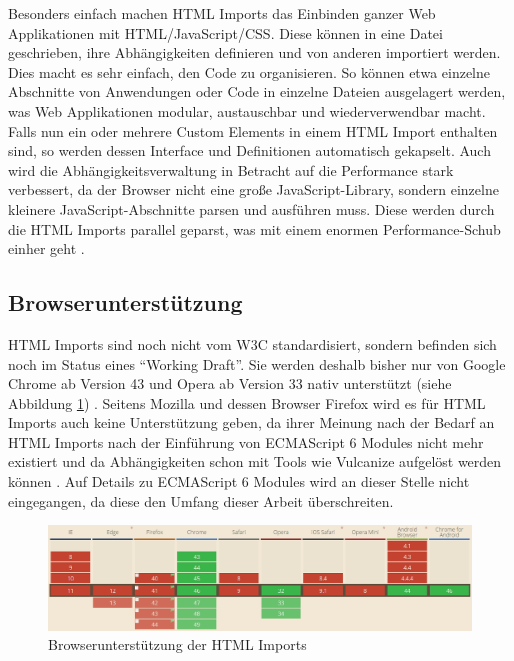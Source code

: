 Besonders einfach machen \ac{HTML} Imports das Einbinden ganzer Web Applikationen mit \ac{HTML}/JavaScript/\ac{CSS}. Diese können in eine Datei geschrieben, ihre Abhängigkeiten definieren und von anderen importiert werden. Dies macht es sehr einfach, den Code zu organisieren. So können etwa einzelne Abschnitte von Anwendungen oder Code in einzelne Dateien ausgelagert werden, was Web Applikationen modular, austauschbar und wiederverwendbar macht. Falls nun ein oder mehrere Custom Elements in einem \ac{HTML} Import enthalten sind, so werden dessen Interface und Definitionen automatisch gekapselt. Auch wird die Abhängigkeitsverwaltung in Betracht auf die Performance stark verbessert, da der Browser nicht eine große JavaScript-Library, sondern einzelne kleinere JavaScript-Abschnitte parsen und ausführen muss. Diese werden durch die \ac{HTML} Imports parallel geparst, was mit einem enormen Performance-Schub einher geht \cite{citeulike:13853647}.


\subsection{Browserunterstützung}\label{browserunterstuxfctzung}

\ac{HTML} Imports sind noch nicht vom \ac{W3C} standardisiert, sondern befinden sich noch im Status eines ``Working Draft''. Sie werden deshalb bisher nur von Google Chrome ab Version 43 und Opera ab Version 33 nativ unterstützt (siehe Abbildung \ref{fig:bdhtmli}) \cite{citeulike:13853711}. Seitens Mozilla und dessen Browser Firefox wird es für \ac{HTML} Imports auch keine Unterstützung geben, da ihrer Meinung nach der Bedarf an \ac{HTML} Imports nach der Einführung von ECMAScript 6 Modules nicht mehr existiert und da Abhängigkeiten schon mit Tools wie Vulcanize aufgelöst werden können \cite{citeulike:13881144}. Auf Details zu ECMAScript 6 Modules wird an dieser Stelle nicht eingegangen, da diese den Umfang dieser Arbeit überschreiten.

\begin{figure}[htbp]
 \centering
 \includegraphics[width=\linewidth]{kapitel2/bilder/5-html-imports-browserunterstuetzung}
 \caption{Browserunterstützung der HTML Imports}
 \label{fig:bdhtmli}
\end{figure}

